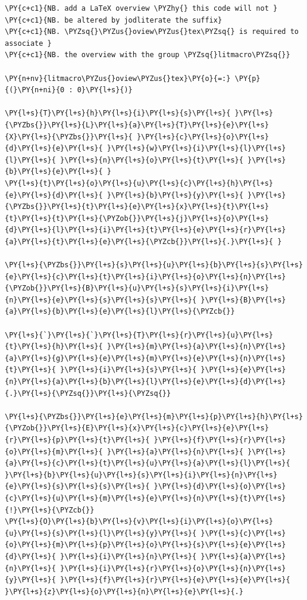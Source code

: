     \begin{tcolorbox}[breakable, size=fbox, boxrule=1pt, pad at break*=1mm,colback=cellbackground, colframe=cellborder]
\begin{Verbatim}[commandchars=\\\{\}]
\PY{c+c1}{NB. add a LaTeX overview \PYZhy{} this code will not }
\PY{c+c1}{NB. be altered by jodliterate the suffix}
\PY{c+c1}{NB. \PYZsq{}\PYZus{}oview\PYZus{}tex\PYZsq{} is required to associate }
\PY{c+c1}{NB. the overview with the group \PYZsq{}litmacro\PYZsq{}}

\PY{n+nv}{litmacro\PYZus{}oview\PYZus{}tex}\PY{o}{=:} \PY{p}{(}\PY{n+ni}{0 : 0}\PY{l+s}{)}

\PY{l+s}{T}\PY{l+s}{h}\PY{l+s}{i}\PY{l+s}{s}\PY{l+s}{ }\PY{l+s}{\PYZbs{}}\PY{l+s}{L}\PY{l+s}{a}\PY{l+s}{T}\PY{l+s}{e}\PY{l+s}{X}\PY{l+s}{\PYZbs{}}\PY{l+s}{ }\PY{l+s}{c}\PY{l+s}{o}\PY{l+s}{d}\PY{l+s}{e}\PY{l+s}{ }\PY{l+s}{w}\PY{l+s}{i}\PY{l+s}{l}\PY{l+s}{l}\PY{l+s}{ }\PY{l+s}{n}\PY{l+s}{o}\PY{l+s}{t}\PY{l+s}{ }\PY{l+s}{b}\PY{l+s}{e}\PY{l+s}{ }
\PY{l+s}{t}\PY{l+s}{o}\PY{l+s}{u}\PY{l+s}{c}\PY{l+s}{h}\PY{l+s}{e}\PY{l+s}{d}\PY{l+s}{ }\PY{l+s}{b}\PY{l+s}{y}\PY{l+s}{ }\PY{l+s}{\PYZbs{}}\PY{l+s}{t}\PY{l+s}{e}\PY{l+s}{x}\PY{l+s}{t}\PY{l+s}{t}\PY{l+s}{t}\PY{l+s}{\PYZob{}}\PY{l+s}{j}\PY{l+s}{o}\PY{l+s}{d}\PY{l+s}{l}\PY{l+s}{i}\PY{l+s}{t}\PY{l+s}{e}\PY{l+s}{r}\PY{l+s}{a}\PY{l+s}{t}\PY{l+s}{e}\PY{l+s}{\PYZcb{}}\PY{l+s}{.}\PY{l+s}{ }

\PY{l+s}{\PYZbs{}}\PY{l+s}{s}\PY{l+s}{u}\PY{l+s}{b}\PY{l+s}{s}\PY{l+s}{e}\PY{l+s}{c}\PY{l+s}{t}\PY{l+s}{i}\PY{l+s}{o}\PY{l+s}{n}\PY{l+s}{\PYZob{}}\PY{l+s}{B}\PY{l+s}{u}\PY{l+s}{s}\PY{l+s}{i}\PY{l+s}{n}\PY{l+s}{e}\PY{l+s}{s}\PY{l+s}{s}\PY{l+s}{ }\PY{l+s}{B}\PY{l+s}{a}\PY{l+s}{b}\PY{l+s}{e}\PY{l+s}{l}\PY{l+s}{\PYZcb{}}

\PY{l+s}{`}\PY{l+s}{`}\PY{l+s}{T}\PY{l+s}{r}\PY{l+s}{u}\PY{l+s}{t}\PY{l+s}{h}\PY{l+s}{ }\PY{l+s}{m}\PY{l+s}{a}\PY{l+s}{n}\PY{l+s}{a}\PY{l+s}{g}\PY{l+s}{e}\PY{l+s}{m}\PY{l+s}{e}\PY{l+s}{n}\PY{l+s}{t}\PY{l+s}{ }\PY{l+s}{i}\PY{l+s}{s}\PY{l+s}{ }\PY{l+s}{e}\PY{l+s}{n}\PY{l+s}{a}\PY{l+s}{b}\PY{l+s}{l}\PY{l+s}{e}\PY{l+s}{d}\PY{l+s}{.}\PY{l+s}{\PYZsq{}}\PY{l+s}{\PYZsq{}}

\PY{l+s}{\PYZbs{}}\PY{l+s}{e}\PY{l+s}{m}\PY{l+s}{p}\PY{l+s}{h}\PY{l+s}{\PYZob{}}\PY{l+s}{E}\PY{l+s}{x}\PY{l+s}{c}\PY{l+s}{e}\PY{l+s}{r}\PY{l+s}{p}\PY{l+s}{t}\PY{l+s}{ }\PY{l+s}{f}\PY{l+s}{r}\PY{l+s}{o}\PY{l+s}{m}\PY{l+s}{ }\PY{l+s}{a}\PY{l+s}{n}\PY{l+s}{ }\PY{l+s}{a}\PY{l+s}{c}\PY{l+s}{t}\PY{l+s}{u}\PY{l+s}{a}\PY{l+s}{l}\PY{l+s}{ }\PY{l+s}{b}\PY{l+s}{u}\PY{l+s}{s}\PY{l+s}{i}\PY{l+s}{n}\PY{l+s}{e}\PY{l+s}{s}\PY{l+s}{s}\PY{l+s}{ }\PY{l+s}{d}\PY{l+s}{o}\PY{l+s}{c}\PY{l+s}{u}\PY{l+s}{m}\PY{l+s}{e}\PY{l+s}{n}\PY{l+s}{t}\PY{l+s}{!}\PY{l+s}{\PYZcb{}}
\PY{l+s}{O}\PY{l+s}{b}\PY{l+s}{v}\PY{l+s}{i}\PY{l+s}{o}\PY{l+s}{u}\PY{l+s}{s}\PY{l+s}{l}\PY{l+s}{y}\PY{l+s}{ }\PY{l+s}{c}\PY{l+s}{o}\PY{l+s}{m}\PY{l+s}{p}\PY{l+s}{o}\PY{l+s}{s}\PY{l+s}{e}\PY{l+s}{d}\PY{l+s}{ }\PY{l+s}{i}\PY{l+s}{n}\PY{l+s}{ }\PY{l+s}{a}\PY{l+s}{n}\PY{l+s}{ }\PY{l+s}{i}\PY{l+s}{r}\PY{l+s}{o}\PY{l+s}{n}\PY{l+s}{y}\PY{l+s}{ }\PY{l+s}{f}\PY{l+s}{r}\PY{l+s}{e}\PY{l+s}{e}\PY{l+s}{ }\PY{l+s}{z}\PY{l+s}{o}\PY{l+s}{n}\PY{l+s}{e}\PY{l+s}{.}


\end{Verbatim}
\end{tcolorbox}
